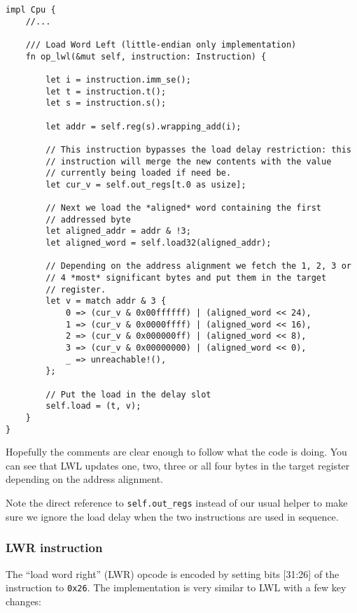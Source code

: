 \documentclass[a4paper]{article}
\newcommand{\code}[1] {\texttt{#1}}
\begin{document}
\begin{lstlisting}
impl Cpu {
    //...

    /// Load Word Left (little-endian only implementation)
    fn op_lwl(&mut self, instruction: Instruction) {

        let i = instruction.imm_se();
        let t = instruction.t();
        let s = instruction.s();

        let addr = self.reg(s).wrapping_add(i);

        // This instruction bypasses the load delay restriction: this
        // instruction will merge the new contents with the value
        // currently being loaded if need be.
        let cur_v = self.out_regs[t.0 as usize];

        // Next we load the *aligned* word containing the first
        // addressed byte
        let aligned_addr = addr & !3;
        let aligned_word = self.load32(aligned_addr);

        // Depending on the address alignment we fetch the 1, 2, 3 or
        // 4 *most* significant bytes and put them in the target
        // register.
        let v = match addr & 3 {
            0 => (cur_v & 0x00ffffff) | (aligned_word << 24),
            1 => (cur_v & 0x0000ffff) | (aligned_word << 16),
            2 => (cur_v & 0x000000ff) | (aligned_word << 8),
            3 => (cur_v & 0x00000000) | (aligned_word << 0),
            _ => unreachable!(),
        };

        // Put the load in the delay slot
        self.load = (t, v);
    }
}
\end{lstlisting}

Hopefully the comments are clear enough to follow what the code is
doing. You can see that LWL updates one, two, three or all four bytes
in the target register depending on the address alignment.

Note the direct reference to \code{self.out\_regs} instead of our usual
helper to make sure we ignore the load delay when the two instructions
are used in sequence.

\subsubsection{LWR instruction}

The ``load word right'' (LWR) opcode is encoded by setting bits
[31:26] of the instruction to \code{0x26}. The implementation is very
similar to LWL with a few key changes:
\end{document}
